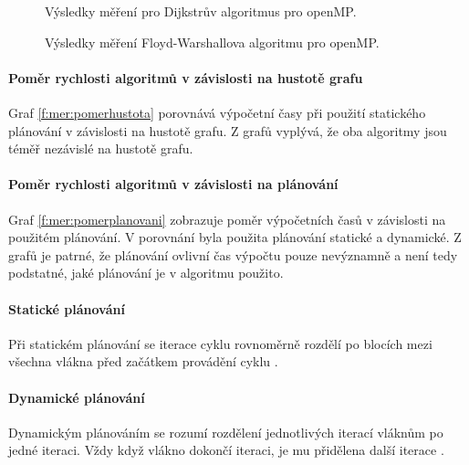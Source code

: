 \begin{figure}
    \centering
    \caption{Výsledky měření pro Dijkstrův algoritmus pro openMP.}
    \label{f:omp:vysledky:dijkstra}
\end{figure}

\begin{figure}
    \centering
    \caption{Výsledky měření Floyd-Warshallova algoritmu pro openMP.}
    \label{f:omp:vysledky:fw}
\end{figure}

\paragraph{Poměr rychlosti algoritmů v závislosti na hustotě grafu}
Graf \ref{f:mer:pomerhustota} porovnává výpočetní časy při použití statického plánování v závislosti na hustotě grafu. Z grafů vyplývá, že oba algoritmy jsou téměř nezávislé na hustotě grafu.

\paragraph{Poměr rychlosti algoritmů v závislosti na plánování}
Graf \ref{f:mer:pomerplanovani} zobrazuje poměr výpočetních časů v závislosti na použitém plánování. V porovnání byla použita plánování statické a dynamické. Z grafů je patrné, že plánování ovlivní čas výpočtu pouze nevýznamně a není tedy podstatné, jaké plánování je v algoritmu použito.
\paragraph{Statické plánování}
Při statickém plánování se iterace cyklu rovnoměrně rozdělí po blocích mezi všechna vlákna před začátkem provádění cyklu \cite{w:omp}.
\paragraph{Dynamické plánování}
Dynamickým plánováním se rozumí rozdělení jednotlivých iterací vláknům po jedné iteraci. Vždy když vlákno dokončí iteraci, je mu přidělena další iterace \cite{w:omp}.

